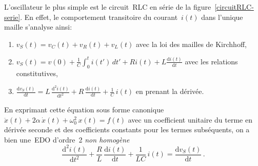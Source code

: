 \documentclass[canadien,12pt,oneside,letterpaper]{article}
\begin{document}
L'oscillateur le plus simple est le circuit~RLC en série de la figure~\ref{circuitRLC-serie}. En effet, le comportement transitoire du courant~$i(t)$ dans l'unique maille s'analyse ainsi:
\begin{enumerate}
    \item $v_S(t)=v_C(t)+v_R(t)+v_L(t)$ avec la loi des mailles de Kirchhoff,
    \item $\displaystyle v_S(t)=v(0)+\frac{1}{C}\int_0^ti(t')\,dt'+Ri(t)+L\frac{\mathrm{d}i(t)}{\mathrm{d}t}$ avec les relations constitutives,
  \item $\displaystyle \frac{\mathrm{d}v_S(t)}{\mathrm{d}t} = L\,\frac{\mathrm{d}^2i(t)}{\mathrm{d}t^2}+R\,\frac{\mathrm{d}i(t)}{\mathrm{d}t}+\frac{1}{C}\,i(t)$ en prenant la dérivée.
\end{enumerate}
En exprimant cette équation sous forme canonique $\ddot x(t) + 2\alpha\,\dot x(t) + \omega_0^2\,x(t) = f(t)$ avec un coefficient unitaire du terme en dérivée seconde et des coefficients constants pour les termes subséquents, on a bien une~EDO d'ordre~2 \textit{non homogène}
\begin{equation}\label{eq:RCL}
    \frac{\mathrm{d}^2i(t)}{\mathrm{d}t^2}+\frac{R}{L}\,\frac{\mathrm{d}i(t)}{\mathrm{d}t}+\frac{1}{LC}\,i(t) = \frac{\mathrm{d}v_S(t)}{\mathrm{d}t}\,.
\end{equation}
\end{document}
